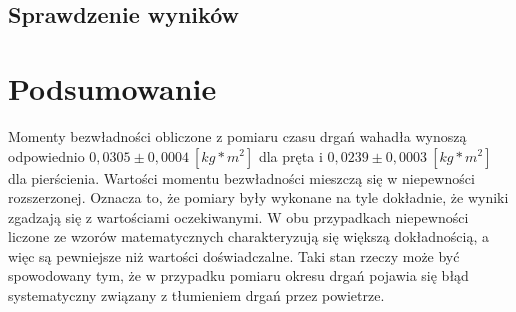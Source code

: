\documentclass[a4paper,10pt,twoside]{article}
\begin{document}
\newpage
\subsection{Sprawdzenie wyników}


\section{Podsumowanie}
Momenty bezwładności obliczone z pomiaru czasu drgań wahadła wynoszą odpowiednio $0,0305 \pm 0,0004~[kg*m^2]$ dla pręta i $0,0239 \pm 0,0003~[kg*m^2]$ dla pierścienia.
Wartości momentu bezwładności mieszczą się w niepewności rozszerzonej. Oznacza to, że pomiary były wykonane na tyle dokładnie, że wyniki
zgadzają się z wartościami oczekiwanymi. W obu przypadkach niepewności liczone ze wzorów matematycznych charakteryzują się większą dokładnością, a więc
są pewniejsze niż wartości doświadczalne. Taki stan rzeczy może być spowodowany tym, że w przypadku pomiaru okresu drgań pojawia się błąd systematyczny
związany z tłumieniem drgań przez powietrze. 
\end{document}
